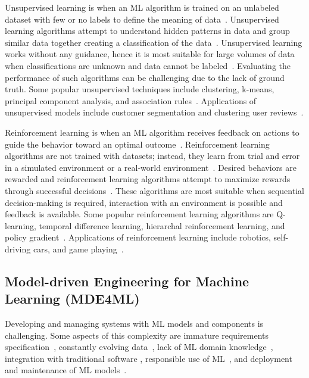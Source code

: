 Unsupervised learning is when an ML algorithm is trained on an unlabeled dataset with few or no labels to define the meaning of data~\cite{mueller2021machine,lee2020machine}. Unsupervised learning algorithms attempt to understand hidden patterns in data and group similar data together creating a classification of the data~\cite{mueller2021machine}. Unsupervised learning works without any guidance, hence it is most suitable for large volumes of data when classifications are unknown and data cannot be labeled~\cite{mueller2021machine}. Evaluating the performance of such algorithms can be challenging due to the lack of ground truth. Some popular unsupervised techniques include clustering, k-means, principal component analysis, and association rules~\cite{lee2020machine}. Applications of unsupervised models include customer segmentation and clustering user reviews~\cite{mueller2021machine}.

 Reinforcement learning is when an ML algorithm receives feedback on actions to guide the behavior toward an optimal outcome~\cite{mueller2021machine, lee2020machine}. Reinforcement learning algorithms are not trained with datasets; instead, they learn from trial and error in a simulated environment or a real-world environment~\cite{mueller2021machine}. Desired behaviors are rewarded and reinforcement learning algorithms attempt to maximize rewards through successful decisions~\cite{lee2020machine,mueller2021machine}. These algorithms are most suitable when sequential decision-making is required, interaction with an environment is possible and feedback is available. %
 Some popular reinforcement learning algorithms are Q-learning, temporal difference learning, hierarchal reinforcement learning, and policy gradient~\cite{lee2020machine}. Applications of reinforcement learning include robotics, self-driving cars, and game playing~\cite{lee2020machine}.
 
\subsection{Model-driven Engineering for Machine Learning (MDE4ML)}
Developing and managing systems with ML models and components is challenging. 
Some aspects of this complexity are immature requirements specification~\cite{kuwajima2020engineering, ahmad2023requirements}, constantly evolving data~\cite{baumann2022dynamic}, lack of ML domain knowledge~\cite{yohannis2022towards}, integration with traditional software \cite{atouani2021artifact}, responsible use of ML~\cite{yohannis2022towards}, and deployment and maintenance of ML models~\cite{kourouklidis2021model, langford2021modalas}. 

